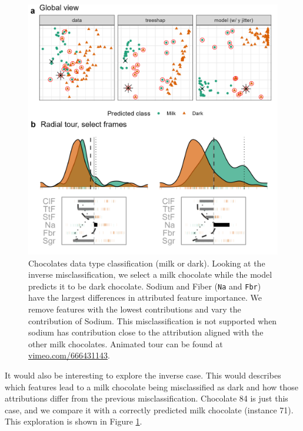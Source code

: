 \documentclass[
]{article}
\begin{document}
\begin{figure}

{\centering \includegraphics[width=1\linewidth]{./figures/case_chocolates_inverse} 

}

\caption{Chocolates data type classification (milk or dark). Looking at the inverse misclassification, we select a milk chocolate while the model predicts it to be dark chocolate. Sodium and Fiber (\texttt{Na} and \texttt{Fbr}) have the largest differences in attributed feature importance. We remove features with the lowest contributions and vary the contribution of Sodium. This misclassification is not supported when sodium has contribution close to the attribution aligned with the other milk chocolates. Animated tour can be found at \href{https://vimeo.com/666431143}{vimeo.com/666431143}.}\label{fig:casechocolatesinverse}
\end{figure}

It would also be interesting to explore the inverse case. This would describes which features lead to a milk chocolate being misclassified as dark and how those attributions differ from the previous misclassification. Chocolate 84 is just this case, and we compare it with a correctly predicted milk chocolate (instance 71). This exploration is shown in Figure \ref{fig:casechocolatesinverse}.
\end{document}
